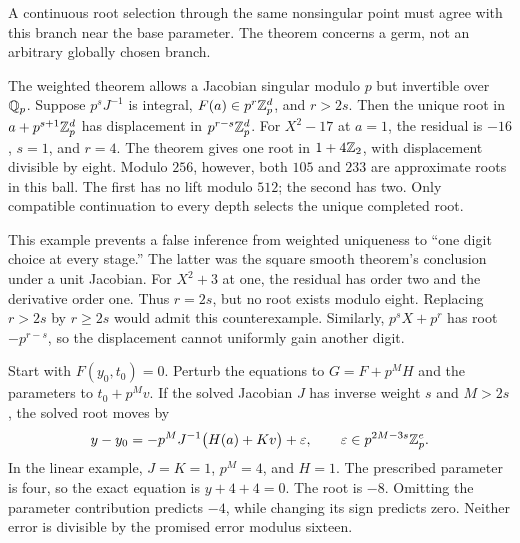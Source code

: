 A continuous root selection through the same nonsingular point must agree with this branch near the base parameter. The theorem concerns a germ, not an arbitrary globally chosen branch.

The weighted theorem allows a Jacobian singular modulo $p$ but invertible over $\mathbb Q_p$. Suppose $p^sJ^{-1}$ is integral, $F(a)\in p^r\mathbb Z_p^d$, and $r>2s$. Then the unique root in $a+p^{s+1}\mathbb Z_p^d$ has displacement in $p^{r-s}\mathbb Z_p^d$.
For $X^2-17$ at $a=1$, the residual is $-16$, $s=1$, and $r=4$. The theorem gives one root in $1+4\mathbb Z_2$, with displacement divisible by eight. Modulo $256$, however, both $105$ and $233$ are approximate roots in this ball. The first has no lift modulo $512$; the second has two. Only compatible continuation to every depth selects the unique completed root.

This example prevents a false inference from weighted uniqueness to ``one digit choice at every stage.'' The latter was the square smooth theorem's conclusion under a unit Jacobian.
For $X^2+3$ at one, the residual has order two and the derivative order one. Thus $r=2s$, but no root exists modulo eight. Replacing $r>2s$ by $r\ge2s$ would admit this counterexample. Similarly, $p^sX+p^r$ has root $-p^{r-s}$, so the displacement cannot uniformly gain another digit.

Start with $F(y_0,t_0)=0$. Perturb the equations to $G=F+p^MH$ and the parameters to $t_0+p^Mv$. If the solved Jacobian $J$ has inverse weight $s$ and $M>2s$, the solved root moves by
\[
 y-y_0=-p^MJ^{-1}\bigl(H(a)+Kv\bigr)+\varepsilon,
 \qquad \varepsilon\in p^{2M-3s}\mathbb Z_p^e.
\]
In the linear example, $J=K=1$, $p^M=4$, and $H=1$. The prescribed parameter is four, so the exact equation is $y+4+4=0$. The root is $-8$. Omitting the parameter contribution predicts $-4$, while changing its sign predicts zero. Neither error is divisible by the promised error modulus sixteen.

